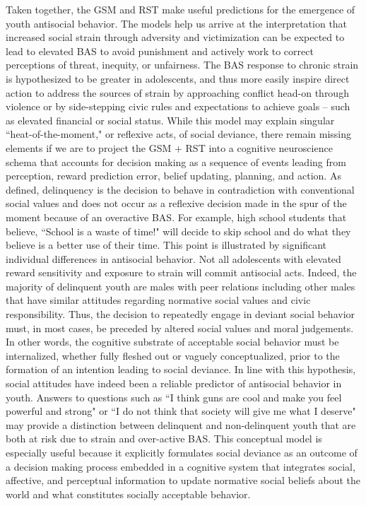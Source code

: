 \documentclass[utf8]{article}
\begin{document}
Taken together, the GSM and RST make useful predictions for the emergence of youth antisocial behavior. The models help us arrive at the interpretation that increased social strain through adversity and victimization can be expected to lead to elevated BAS to avoid punishment and actively work to correct perceptions of threat, inequity, or unfairness. The BAS response to chronic strain is hypothesized to be greater in adolescents, and thus more easily inspire direct action to address the sources of strain by approaching conflict head-on through violence or by side-stepping civic rules and expectations to achieve goals -- such as elevated financial or social status. While this model may explain singular  ``heat-of-the-moment," or reflexive acts, of social deviance, there remain missing elements if we are to project the GSM + RST into a cognitive neuroscience schema that accounts for decision making as a sequence of events leading from perception, reward prediction error, belief updating, planning, and action. As defined, delinquency is the decision to behave in contradiction with conventional social values and does not occur as a reflexive decision made in the spur of the moment because of an overactive BAS. For example, high school students that believe, ``School is a waste of time!" will decide to skip school and do what they believe is a better use of their time. This point is illustrated by significant individual differences in antisocial behavior. Not all adolescents with elevated reward sensitivity and exposure to strain will commit antisocial acts. Indeed, the majority of delinquent youth are males with peer relations including other males that have similar attitudes regarding normative social values and civic responsibility. Thus, the decision to repeatedly engage in deviant social behavior must, in most cases, be preceded by altered social values and moral judgements. In other words, the cognitive substrate of acceptable social behavior must be internalized, whether fully fleshed out or vaguely conceptualized, prior to the formation of an intention leading to social deviance. In line with this hypothesis, social attitudes have indeed been a reliable predictor of antisocial behavior in youth. Answers to questions such as ``I think guns are cool and make you feel powerful and strong" or ``I do not think that society will give me what I deserve" may provide a distinction between delinquent and non-delinquent youth that are both at risk due to strain and over-active BAS. This conceptual model is especially useful because it explicitly formulates social deviance as an outcome of a decision making process embedded in a cognitive system that integrates social, affective, and perceptual information to update normative social beliefs about the world and what constitutes socially acceptable behavior.
\end{document}
